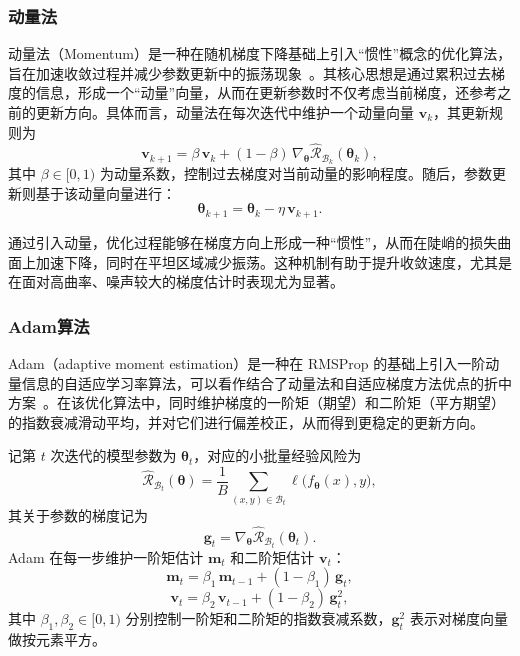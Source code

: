 \subsubsection{动量法}
动量法（Momentum）是一种在随机梯度下降基础上引入“惯性”概念的优化算法，旨在加速收敛过程并减少参数更新中的振荡现象~\cite{polyak1964some}。其核心思想是通过累积过去梯度的信息，形成一个“动量”向量，从而在更新参数时不仅考虑当前梯度，还参考之前的更新方向。具体而言，动量法在每次迭代中维护一个动量向量 $\bm{v}_k$，其更新规则为
\begin{equation}
    \bm{v}_{k+1}
    = \beta \,\bm{v}_k
    + (1 - \beta) \,\nabla_{\bm{\theta}}
    \hat{\mathcal{R}}_{\mathcal{B}_k}(\bm{\theta}_{k}),
\end{equation}
其中 $\beta \in [0,1)$ 为动量系数，控制过去梯度对当前动量的影响程度。随后，参数更新则基于该动量向量进行：
\begin{equation}
    \bm{\theta}_{k+1}
    = \bm{\theta}_{k}
    - \eta \,\bm{v}_{k+1}.
\end{equation}

通过引入动量，优化过程能够在梯度方向上形成一种“惯性”，从而在陡峭的损失曲面上加速下降，同时在平坦区域减少振荡。这种机制有助于提升收敛速度，尤其是在面对高曲率、噪声较大的梯度估计时表现尤为显著。

\subsubsection{Adam算法}
Adam（adaptive moment estimation）是一种在 RMSProp 的基础上引入一阶动量信息的自适应学习率算法，可以看作结合了动量法和自适应梯度方法优点的折中方案~\cite{kingma2015adam}。在该优化算法中，同时维护梯度的一阶矩（期望）和二阶矩（平方期望）的指数衰减滑动平均，并对它们进行偏差校正，从而得到更稳定的更新方向。

记第 $t$ 次迭代的模型参数为 $\bm{\theta}_t$，对应的小批量经验风险为
\begin{equation}
    \hat{\mathcal{R}}_{\mathcal{B}_t}(\bm{\theta})
    = \frac{1}{B} \sum_{(x,y) \in \mathcal{B}_t}
    \ell\bigl(f_{\bm{\theta}}(x), y\bigr),
\end{equation}
其关于参数的梯度记为
\begin{equation}
    \bm{g}_t
    = \nabla_{\bm{\theta}}
    \hat{\mathcal{R}}_{\mathcal{B}_t}(\bm{\theta}_t).
\end{equation}
Adam 在每一步维护一阶矩估计 $\bm{m}_t$ 和二阶矩估计 $\bm{v}_t$：
\begin{equation}
    \bm{m}_t = \beta_1 \, \bm{m}_{t-1} + (1-\beta_1) \, \bm{g}_t,
\end{equation}
\begin{equation}
    \bm{v}_t = \beta_2 \, \bm{v}_{t-1} + (1-\beta_2) \, \bm{g}_t^{2},
\end{equation}
其中 $\beta_1, \beta_2 \in [0,1)$ 分别控制一阶矩和二阶矩的指数衰减系数，$\bm{g}_t^{2}$ 表示对梯度向量做按元素平方。

